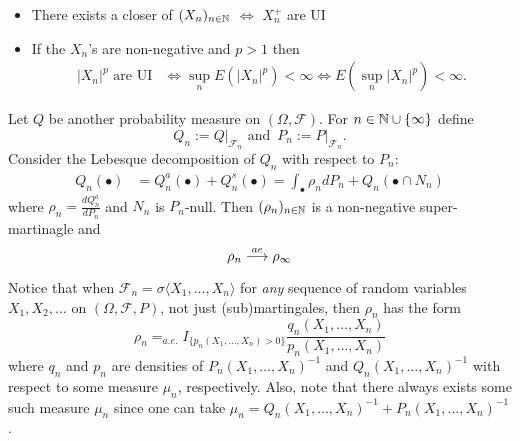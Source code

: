 \begin{theorem}$\phantom{a}$
\begin{itemize}
\item There exists a closer of  $(X_n)_{n\in \Bbb N}$ $\Longleftrightarrow$  $X_n^+$ are UI
\item If the $X_n$'s are non-negative and $p>1$ then
\begin{align*}
\text{$|X_n|^p$ are UI} & \Longleftrightarrow  \sup_n E(|X_n|^p)<\infty \Longleftrightarrow  E(\sup_n |X_n|^p)<\infty.
\end{align*}
\end{itemize}
\end{theorem}

\begin{theorem}
Let $Q$ be another probability measure on $(\Omega, \mathcal F)$. For $n\in \Bbb N \cup\{\infty \}$ define
\[
Q_n:=Q\bigr|_{\mathcal F_n}\text{ and }\, P_n:=P\bigr|_{\mathcal F_n}.
\]
Consider the Lebesque decomposition of $Q_n$ with respect to $P_n$:
\begin{align*}
Q_n(\bullet) &= Q_n^a (\bullet) + Q_n^s(\bullet) =  \int_\bullet \rho_n dP_n + Q_n(\bullet \cap N_n)
\end{align*}
where $\rho_n = \frac{dQ_n^a}{dP_n}$ and $N_n$ is $P_n$-null. Then $(\rho_n)_{n\in \Bbb N}$ is a non-negative super-martinagle  and
\[
\rho_n\overset{\small ae} \longrightarrow \rho_\infty
\]
\end{theorem}

Notice that when $\mathcal F_n=\sigma\langle X_1, \ldots, X_n\rangle$ for {\em any} sequence of random variables $X_1, X_2, \ldots$ on $(\Omega, \mathcal F, P)$, not just (sub)martingales, then $\rho_n$ has the form
\[
\rho_n =_{a.e.} I_{\{p_n(X_1,\ldots, X_n)>0\}}\frac{q_n(X_1,\ldots, X_n)}{p_n(X_1,\ldots, X_n)}
\]
where $q_n$ and $p_n$ are densities of $P_n(X_1,\ldots, X_n)^{-1}$ and $Q_n(X_1,\ldots, X_n)^{-1}$   with respect to some measure $\mu_n$, respectively.  Also, note that there always exists some such  measure $\mu_n$ since one can take $\mu_n = Q_n(X_1,\ldots, X_n)^{-1} + P_n(X_1,\ldots, X_n)^{-1}$.


